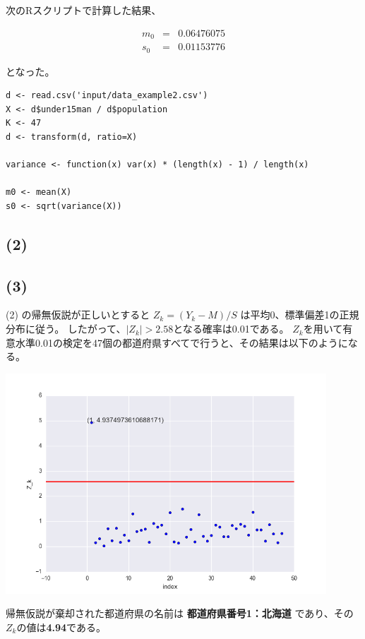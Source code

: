 \documentclass[a4j,xelatex,ja=standard,jafont=hiragino-pron, 9pt]{bxjsarticle}
\let\origfigure=\figure
\let\endorigfigure=\endfigure
\renewenvironment{figure}[1][]{%
  \origfigure[H]
}{%
  \endorigfigure
}
\begin{document}
次のRスクリプトで計算した結果、

\begin{eqnarray}
    m_0 &=& 0.06476075  \\
    s_0 &=& 0.01153776
\end{eqnarray}

となった。

\begin{lstlisting}
d <- read.csv('input/data_example2.csv')
X <- d$under15man / d$population
K <- 47
d <- transform(d, ratio=X)

variance <- function(x) var(x) * (length(x) - 1) / length(x)

m0 <- mean(X)
s0 <- sqrt(variance(X))
\end{lstlisting}

\subsection*{(2)}

\subsection*{(3)}

(2) の帰無仮説が正しいとすると $Z_k = (Y_k - M) / S$ は平均0、標準偏差1の正規分布に従う。
したがって、$|Z_k| > 2.58$となる確率は0.01である。
$Z_k$を用いて有意水準0.01の検定を47個の都道府県すべてで行うと、その結果は以下のようになる。

\begin{figure}
  \centering
  \includegraphics[width=12cm]{../src/output/image/examine.png}
  \caption{検定の結果}
  \label{}
\end{figure}

帰無仮説が棄却された都道府県の名前は
\textbf{都道府県番号1：北海道}
であり、その$Z_k$の値は\textbf{4.94}である。
\end{document}
